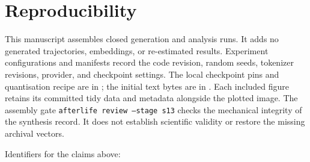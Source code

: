 \documentclass[10pt]{article}
\begin{document}
\section{Reproducibility}
\label{sec:repro}

This manuscript assembles closed generation and analysis runs.
It adds no generated trajectories, embeddings, or re-estimated results.
Experiment configurations and manifests record the code revision,
random seeds, tokenizer revisions, provider, and checkpoint settings.
The local checkpoint pins and quantisation recipe are in
\protect{}; the initial
text bytes are in \protect{}.
Each included figure retains its committed tidy data and metadata
alongside the plotted image.
The assembly gate \texttt{afterlife review --stage s13} checks the
mechanical integrity of the synthesis record. It does not establish
scientific validity or restore the missing archival vectors.

Identifiers for the claims above:
\end{document}
